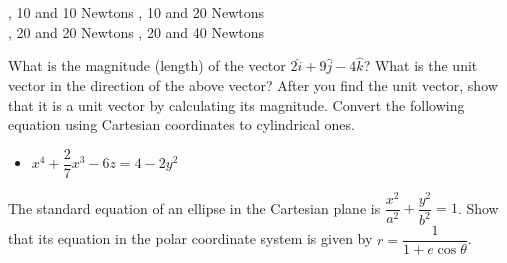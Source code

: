 \documentclass[12pt,addpoints]{exam}
\begin{document}
\begin{questions}
   		\begin{oneparchoices}
   			, 10 and 10 Newtons
   			, 10 and 20 Newtons \\
   			, 20 and 20 Newtons
   			, 20 and 40 Newtons
   		\end{oneparchoices}
   		\question What is the magnitude (length) of the vector  $2\hat{i}+9\hat{j}-4\hat{k}$?\vspace{1in}
   		\question What is the unit vector in the direction of the above vector? After you find the unit vector, show that it is a unit vector by calculating its magnitude.\vspace{1in}
   		\question Convert the following equation using Cartesian coordinates to cylindrical ones.\begin{itemize}
   			\item ${x^4} + \dfrac{2}{7}{x^3} - 6z = 4 - 2{y^2}$\vspace{1.5in}
   		\end{itemize} 
   		\question The standard equation of an ellipse in the Cartesian plane is $\dfrac{x^2}{a^2}+\dfrac{y^2}{b^2}=1$. Show that its equation in the polar coordinate system is given by $r = \dfrac{1}{1+e \cos \theta}$.\vspace{2in}
   		

\end{questions}
\end{document}
